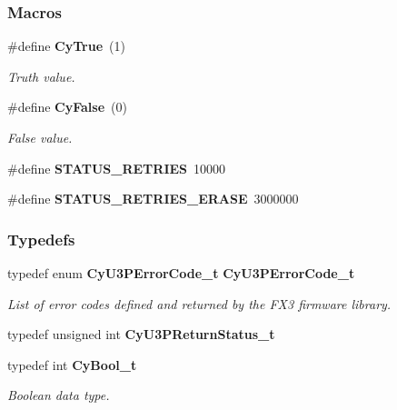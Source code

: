\subsubsection*{Macros}
\begin{DoxyCompactItemize}
\item 
\#define {\bf Cy\+True}~(1)
\begin{DoxyCompactList}\small\item\em Truth value. \end{DoxyCompactList}\item 
\#define {\bf Cy\+False}~(0)
\begin{DoxyCompactList}\small\item\em False value. \end{DoxyCompactList}\item 
\#define {\bf S\+T\+A\+T\+U\+S\+\_\+\+R\+E\+T\+R\+I\+ES}~10000
\item 
\#define {\bf S\+T\+A\+T\+U\+S\+\_\+\+R\+E\+T\+R\+I\+E\+S\+\_\+\+E\+R\+A\+SE}~3000000
\end{DoxyCompactItemize}
\subsubsection*{Typedefs}
\begin{DoxyCompactItemize}
\item 
typedef enum {\bf Cy\+U3\+P\+Error\+Code\+\_\+t} {\bf Cy\+U3\+P\+Error\+Code\+\_\+t}
\begin{DoxyCompactList}\small\item\em List of error codes defined and returned by the F\+X3 firmware library. \end{DoxyCompactList}\item 
typedef unsigned int {\bf Cy\+U3\+P\+Return\+Status\+\_\+t}
\item 
typedef int {\bf Cy\+Bool\+\_\+t}
\begin{DoxyCompactList}\small\item\em Boolean data type. \end{DoxyCompactList}\end{DoxyCompactItemize}
